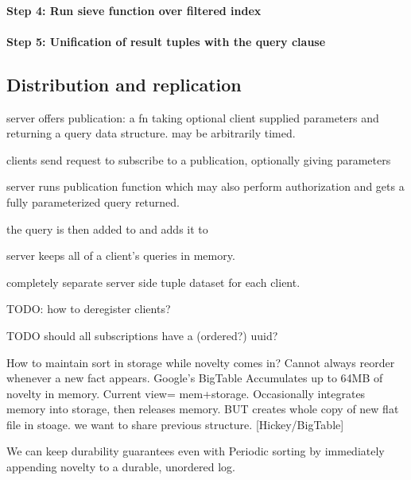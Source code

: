 \paragraph{Step 4: Run sieve function over filtered index}

\paragraph{Step 5: Unification of result tuples with the query clause}



\subsection{Distribution and replication}

server offers publication: a fn taking optional client supplied parameters and returning a query data structure. may be arbitrarily timed.

clients send request to subscribe to a publication, optionally giving parameters

server runs publication function which may also perform authorization and gets a fully parameterized query returned.

the query is then added to and adds it to

server keeps all of a client's queries in memory.

completely separate server side tuple dataset for each client.

TODO: how to deregister clients?

TODO should all subscriptions have a (ordered?) uuid?

How to maintain sort in storage while novelty comes in? Cannot always reorder whenever a new fact appears. Google's BigTable Accumulates up to 64MB of novelty in memory. Current view= mem+storage. Occasionally integrates memory into storage, then releases memory. BUT creates whole copy of new flat file in stoage. we want to share previous structure. [Hickey/BigTable]

We can keep durability guarantees even with Periodic sorting by immediately appending novelty to a durable, unordered log.
